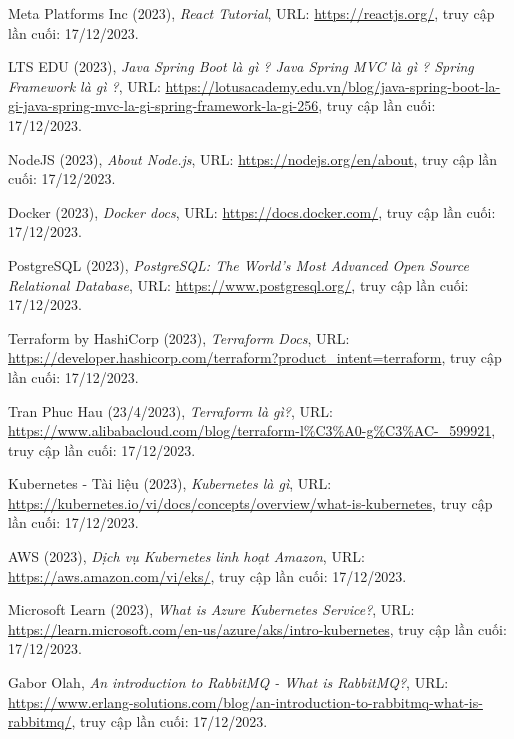 \cleardoublepage
{}
{}

\begin{thebibliography}{1}

Meta Platforms Inc (2023), \emph{React Tutorial}, URL: \url{https://reactjs.org/}, truy cập lần cuối: 17/12/2023.

LTS EDU (2023), \emph{Java Spring Boot là gì ? Java Spring MVC là gì ? Spring Framework là gì ?}, URL: \url{https://lotusacademy.edu.vn/blog/java-spring-boot-la-gi-java-spring-mvc-la-gi-spring-framework-la-gi-256}, truy cập lần cuối: 17/12/2023.

NodeJS (2023), \emph{About Node.js}, URL: \url{https://nodejs.org/en/about}, truy cập lần cuối: 17/12/2023.

Docker (2023), \emph{Docker docs}, URL: \url{https://docs.docker.com/}, truy cập lần cuối: 17/12/2023.

PostgreSQL (2023), \emph{PostgreSQL: The World's Most Advanced Open Source Relational Database}, URL: \url{https://www.postgresql.org/}, truy cập lần cuối: 17/12/2023.

Terraform by HashiCorp (2023), \emph{Terraform Docs}, URL: \url{https://developer.hashicorp.com/terraform?product_intent=terraform}, truy cập lần cuối: 17/12/2023.

Tran Phuc Hau (23/4/2023), \emph{Terraform là gì?}, URL: \url{https://www.alibabacloud.com/blog/terraform-l%C3%A0-g%C3%AC-_599921}, truy cập lần cuối: 17/12/2023.

Kubernetes - Tài liệu (2023), \emph{Kubernetes là gì}, URL: \url{https://kubernetes.io/vi/docs/concepts/overview/what-is-kubernetes}, truy cập lần cuối: 17/12/2023.

AWS (2023), \emph{Dịch vụ Kubernetes linh hoạt Amazon}, URL: \url{https://aws.amazon.com/vi/eks/}, truy cập lần cuối: 17/12/2023.

Microsoft Learn (2023), \emph{What is Azure Kubernetes Service?}, URL: \url{https://learn.microsoft.com/en-us/azure/aks/intro-kubernetes}, truy cập lần cuối: 17/12/2023.

Gabor Olah, \emph{An introduction to RabbitMQ - What is RabbitMQ?}, URL: \url{https://www.erlang-solutions.com/blog/an-introduction-to-rabbitmq-what-is-rabbitmq/}, truy cập lần cuối: 17/12/2023.


\end{thebibliography}
